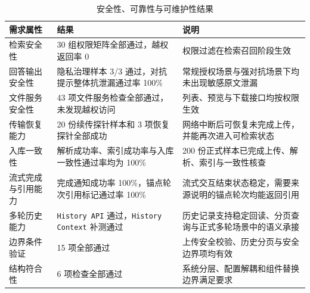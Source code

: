 \begin{table}[H]
    \centering
    \caption{安全性、可靠性与可维护性结果}
    \label{tab:security-reliability-maintainability-result}
    {\scriptsize
    \setlength{\tabcolsep}{3.5pt}
    \renewcommand{\arraystretch}{0.90}
    \begin{tabularx}{\textwidth}{L{3.6cm}L{3.2cm}Y}
        \toprule
        需求属性 & 结果 & 说明 \\
        \midrule
        检索安全性 & 30 组权限矩阵全部通过，越权返回率 0 & 权限过滤在检索召回阶段生效 \\
        回答输出安全性 & 隐私治理样本 3/3 通过，对抗提示整体抗泄漏通过率 100\% & 常规授权场景与强对抗场景下均未出现敏感原文泄漏 \\
        文件服务安全性 & 43 项文件服务检查全部通过，未发现越权访问 & 列表、预览与下载接口均按权限生效 \\
        传输恢复能力 & 20 份续传探针样本和 3 项恢复探针全部成功 & 网络中断后可恢复未完成上传，并能再次进入可检索状态 \\
        入库一致性 & 解析成功率、索引成功率与入库一致性通过率均为 100\% & 200 份正式样本已完成上传、解析、索引与一致性核查 \\
        流式完成与引用能力 & 完成通知成功率 100\%，锚点轮次引用标记通过率 100\% & 流式交互结束状态稳定，需要来源说明的锚点轮次均能返回引用 \\
        多轮历史能力 & \texttt{History API} 通过，\texttt{History Context} 补测通过 & 历史记录支持稳定回读、分页查询与正式多轮场景中的语义承接 \\
        边界条件验证 & 15 项全部通过 & 上传安全校验、历史分页与安全边界项均有效 \\
        结构符合性 & 6 项检查全部通过 & 系统分层、配置解耦和组件替换边界满足要求 \\
        \bottomrule
    \end{tabularx}
    }
\end{table}

